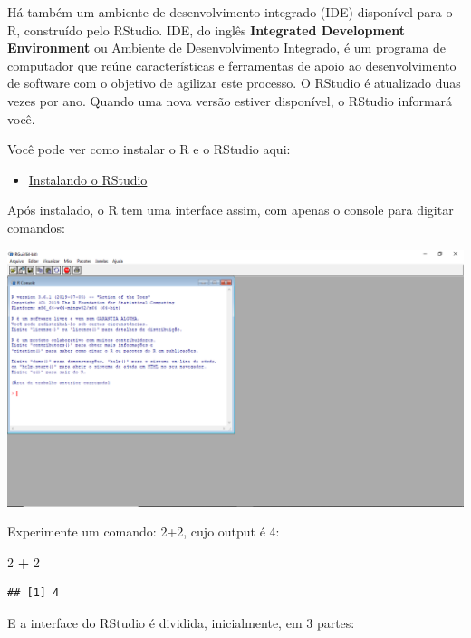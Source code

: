 \documentclass[]{book}
\newenvironment{Shaded}{\begin{snugshade}}{\end{snugshade}}
\newcommand{\DecValTok}[1]{\textcolor[rgb]{0.00,0.00,0.81}{#1}}
\newcommand{\OperatorTok}[1]{\textcolor[rgb]{0.81,0.36,0.00}{\textbf{#1}}}
\newcommand{\StringTok}[1]{\textcolor[rgb]{0.31,0.60,0.02}{#1}}
\providecommand{\tightlist}{%
  \setlength{\itemsep}{0pt}\setlength{\parskip}{0pt}}
\begin{document}
Há também um ambiente de desenvolvimento integrado (IDE) disponível para o R, construído pelo RStudio. IDE, do inglês \textbf{Integrated Development Environment} ou Ambiente de Desenvolvimento Integrado, é um programa de computador que reúne características e ferramentas de apoio ao desenvolvimento de software com o objetivo de agilizar este processo. O RStudio é atualizado duas vezes por ano. Quando uma nova versão estiver disponível, o RStudio informará você.

Você pode ver como instalar o R e o RStudio aqui:

\begin{itemize}
\tightlist
\item
  \href{https://www.youtube.com/watch?v=orjLGFmx6l4}{Instalando o RStudio}
\end{itemize}

Após instalado, o R tem uma interface assim, com apenas o console para digitar comandos:

\begin{center}\includegraphics[width=0.9\linewidth]{imagens/r-project} \end{center}

Experimente um comando: 2+2, cujo output é 4:

\begin{Shaded}
\begin{Highlighting}[]
\DecValTok{2} \OperatorTok{+}\StringTok{ }\DecValTok{2}
\end{Highlighting}
\end{Shaded}

\begin{verbatim}
## [1] 4
\end{verbatim}

E a interface do RStudio é dividida, inicialmente, em 3 partes:
\end{document}
